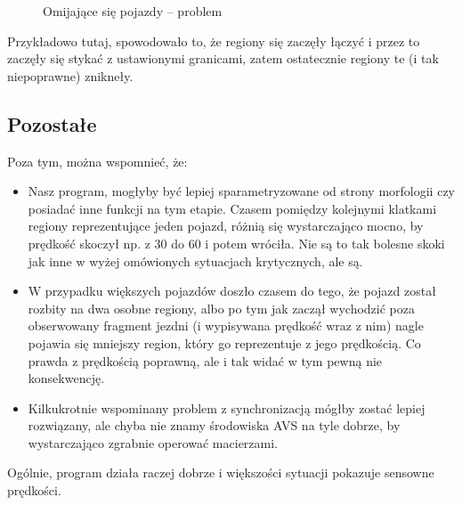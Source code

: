 \documentclass[11pt, a4paper]{article}
\begin{document}
\begin{figure}[htbp!]
	\caption{Omijające się pojazdy -- problem}
	\label{fig:omi2}
\end{figure}

Przykładowo tutaj, spowodowało to, że regiony się zaczęły łączyć i przez to zaczęły się stykać z ustawionymi granicami, zatem ostatecznie regiony te (i tak niepoprawne) znikneły.

\subsection*{Pozostałe}

Poza tym, można wspomnieć, że:
\begin{itemize}
\item Nasz program, mogłyby być lepiej sparametryzowane od strony morfologii czy posiadać inne funkcji na tym etapie. Czasem pomiędzy kolejnymi klatkami regiony reprezentujące jeden pojazd, różnią się wystarczająco mocno, by prędkość skoczył np. z 30 do 60 i potem wróciła. Nie są to tak bolesne skoki jak inne w wyżej omówionych sytuacjach krytycznych, ale są.
\item W przypadku większych pojazdów doszło czasem do tego, że pojazd został rozbity na dwa osobne regiony, albo po tym jak zaczął wychodzić poza obserwowany fragment jezdni (i wypisywana prędkość wraz z nim) nagle pojawia się mniejszy region, który go reprezentuje z jego prędkością. Co prawda z prędkością poprawną, ale i tak widać w tym pewną nie konsekwencję.
\item Kilkukrotnie wspominany problem z synchronizacją mógłby zostać lepiej rozwiązany, ale chyba nie znamy środowiska AVS na tyle dobrze, by wystarczająco zgrabnie operować macierzami.
\end{itemize}

Ogólnie, program działa raczej dobrze i większości sytuacji pokazuje sensowne prędkości.
\end{document}
